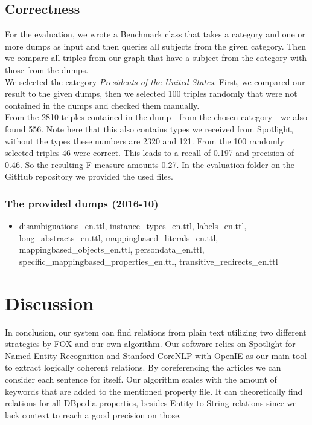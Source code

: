 \documentclass[runningheads]{llncs}
\begin{document}
\subsection{Correctness}
For the evaluation, we wrote a Benchmark class that takes a category and one or more dumps as input and then queries all subjects from the given category. Then we compare all triples from our graph that have a subject from the category with those from the dumps. \\

We selected the category \textit{Presidents of the United States}. First, we compared our result to the given dumps, then we selected 100 triples randomly that were not contained in the dumps and checked them manually.\\

From the 2810 triples contained in the dump - from the chosen category - we also found 556. Note here that this also contains types we received from Spotlight, without the types these numbers are 2320 and 121. From the 100 randomly selected triples 46 were correct. This leads to a recall 
of 0.197 and precision of 0.46. So the resulting F-measure amounts 0.27. In the evaluation folder on the GitHub repository we provided the used files.
\subsubsection{The provided dumps (2016-10)} 
\begin{itemize} 
	\item disambiguations\_en.ttl, instance\_types\_en.ttl, labels\_en.ttl, long\_abstracts\_en.ttl,
	mappingbased\_literals\_en.ttl, mappingbased\_objects\_en.ttl, persondata\_en.ttl, specific\_mappingbased\_properties\_en.ttl, transitive\_redirects\_en.ttl
\end{itemize}


\section{Discussion}
In conclusion, our system can find relations from plain text utilizing two different strategies by FOX and our own algorithm. Our software relies on Spotlight for Named Entity Recognition and Stanford CoreNLP with OpenIE as our main tool to extract logically coherent relations.
By coreferencing the articles we can consider each sentence for itself. Our algorithm scales with the amount of keywords that are added to the mentioned property file. It can theoretically find relations for all DBpedia properties, besides Entity to String relations since we lack context to reach a good precision on those. \\ 
\end{document}
